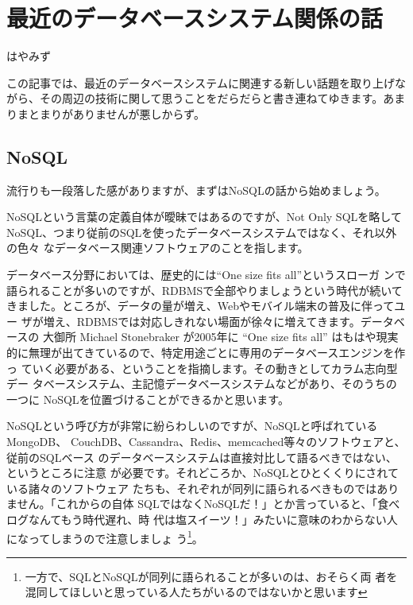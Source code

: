 
\chapter{最近のデータベースシステム関係の話}

\begin{flushright}
 はやみず
\end{flushright}

この記事では、最近のデータベースシステムに関連する新しい話題を取り上げな
がら、その周辺の技術に関して思うことをだらだらと書き連ねてゆきます。あま
りまとまりがありませんが悪しからず。

\section{NoSQL}

流行りも一段落した感がありますが、まずはNoSQLの話から始めましょう。

NoSQLという言葉の定義自体が曖昧ではあるのですが、Not Only SQLを略して
NoSQL、つまり従前のSQLを使ったデータベースシステムではなく、それ以外の色々
なデータベース関連ソフトウェアのことを指します。

データベース分野においては、歴史的には``One size fits all''というスローガ
ンで語られることが多いのですが、RDBMSで全部やりましょうという時代が続いて
きました。ところが、データの量が増え、Webやモバイル端末の普及に伴ってユー
ザが増え、RDBMSでは対応しきれない場面が徐々に増えてきます。データベースの
大御所 Michael Stonebraker が2005年に ``One size fits all'' はもはや現実
的に無理が出てきているので、特定用途ごとに専用のデータベースエンジンを作っ
ていく必要がある、ということを指摘します。その動きとしてカラム志向型デー
タベースシステム、主記憶データベースシステムなどがあり、そのうちの一つに
NoSQLを位置づけることができるかと思います。



NoSQLという呼び方が非常に紛らわしいのですが、NoSQLと呼ばれている MongoDB、
CouchDB、Cassandra、Redis、memcached等々のソフトウェアと、従前のSQLベース
のデータベースシステムは直接対比して語るべきではない、というところに注意
が必要です。それどころか、NoSQLとひとくくりにされている諸々のソフトウェア
たちも、それぞれが同列に語られるべきものではありません。「これからの自体
SQLではなくNoSQLだ！」とか言っていると、「食べログなんてもう時代遅れ、時
代は塩スイーツ！」みたいに意味のわからない人になってしまうので注意しましょ
う\footnote{一方で、SQLとNoSQLが同列に語られることが多いのは、おそらく両
者を混同してほしいと思っている人たちがいるのではないかと思います}。

